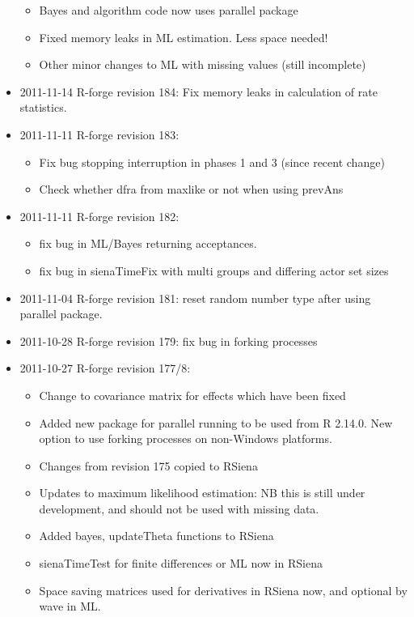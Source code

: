 \documentclass[a4paper,fleqn,11pt]{article}
\newcommand{\+}{\, + \,}
\begin{document}
\begin{small}
\begin{itemize}
\begin{itemize}
\item Bayes and algorithm code now uses parallel package
\item Fixed memory leaks in ML estimation. Less space needed!
\item Other minor changes to ML with missing values (still incomplete)
\end{itemize}
\item 2011-11-14 R-forge revision 184:
Fix memory leaks in calculation of rate statistics.
\item 2011-11-11 R-forge revision 183:
\begin{itemize}
\item Fix bug stopping interruption in phases 1 and 3 (since recent change)
\item Check whether dfra from maxlike or not when using prevAns
\end{itemize}
\item 2011-11-11 R-forge revision 182:
\begin{itemize}
\item fix bug in ML/Bayes returning
  acceptances.
\item fix bug in sienaTimeFix with multi groups and differing actor set sizes
\end{itemize}
\item 2011-11-04 R-forge revision 181: reset random number type after using
  parallel package.
\item 2011-10-28 R-forge revision 179: fix bug in forking processes
\item 2011-10-27 R-forge revision 177/8:
\begin{itemize}
\item Change to covariance matrix for effects which have been fixed
\item Added new package for parallel running to be used from R 2.14.0. New
  option to use forking processes on non-Windows platforms.
\item Changes from revision 175 copied to RSiena
\item Updates to maximum likelihood estimation: NB this is still under
  development, and should not be used with missing data.
\item Added bayes, updateTheta functions to RSiena
\item \textsf{sienaTimeTest} for finite differences or ML now in RSiena
\item Space saving matrices used for derivatives in \textsf{RSiena} now, and optional by
  wave in ML.
\end{itemize}

\end{itemize}
\end{small}
\end{document}

